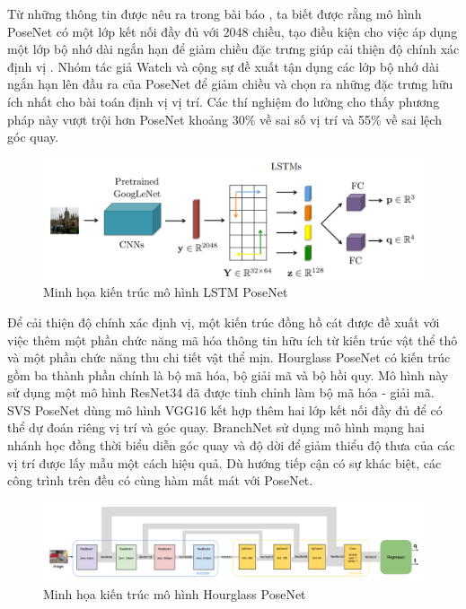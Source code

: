 Từ những thông tin được nêu ra trong bài báo \cite{kendall2016posenet}, ta biết được rằng mô hình PoseNet có một lớp kết nối đầy đủ với 2048 chiều, tạo điều kiện cho việc áp dụng một lớp bộ nhớ dài ngắn hạn để giảm chiều đặc trưng giúp cải thiện độ chính xác định vị \cite{walch2017imagebased, wang2019atloc}. Nhóm tác giả Watch và cộng sự \cite{walch2017imagebased} đề xuất tận dụng các lớp bộ nhớ dài ngắn hạn lên đầu ra của PoseNet để giảm chiều và chọn ra những đặc trưng hữu ích nhất cho bài toán định vị vị trí. Các thí nghiệm đo lường cho thấy phương pháp này vượt trội hơn PoseNet khoảng 30\% về sai số vị trí và 55\% về sai lệch góc quay.
\begin{figure}[H]
    \centering
    \includegraphics[width=\textwidth]{pics/Chapter2/LSTM_PoseNet.png}
    \caption{Minh họa kiến trúc mô hình LSTM PoseNet \cite{walch2017imagebased}}
\end{figure}
Để cải thiện độ chính xác định vị, một kiến trúc đồng hồ cát được đề xuất với việc thêm một phần chức năng mã hóa thông tin hữu ích từ kiến trúc vật thể thô và một phần chức năng thu chi tiết vật thể mịn. Hourglass PoseNet \cite{melekhov2017imagebased} có kiến trúc gồm ba thành phần chính là bộ mã hóa, bộ giải mã và bộ hồi quy. Mô hình này sử dụng một mô hình ResNet34 đã được tinh chỉnh làm bộ mã hóa - giải mã. SVS PoseNet \cite{deep-regression} dùng mô hình VGG16 kết hợp thêm hai lớp kết nối đầy đủ để có thể dự đoán riêng vị trí và góc quay. BranchNet \cite{7989663} sử dụng mô hình mạng hai nhánh học đồng thời biểu diễn góc quay và độ dời để giảm thiểu độ thưa của các vị trí được lấy mẫu một cách hiệu quả. Dù hướng tiếp cận có sự khác biệt, các công trình trên đều có cùng hàm mất mát với PoseNet.
\begin{figure}[H]
    \centering
    \includegraphics[width=\textwidth]{pics/Chapter2/hourglass_PoseNet.png}
    \caption{Minh họa kiến trúc mô hình Hourglass PoseNet \cite{melekhov2017imagebased}}
\end{figure}

